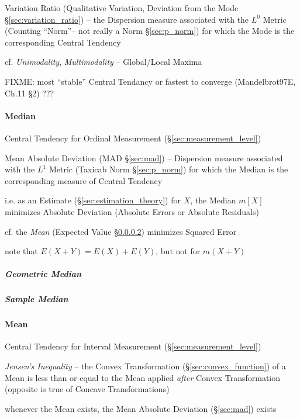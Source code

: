 \fist Variation Ratio (Qualitative Variation, Deviation from the Mode
\S\ref{sec:variation_ratio}) -- the Dispersion measure associated with the $L^0$
Metric (Counting ``Norm''-- not really a Norm \S\ref{sec:p_norm}) for which the
Mode is the corresponding Central Tendency

cf. \emph{Unimodality}, \emph{Multimodality} -- Global/Local Maxima

FIXME: most ``stable'' Central Tendancy or fastest to converge (Mandelbrot97E,
Ch.11 \S 2) ???



\paragraph{Median}\label{sec:median}\hfill

Central Tendency for Ordinal Measurement (\S\ref{sec:measurement_level})

\fist Mean Absolute Deviation (MAD \S\ref{sec:mad}) -- Dispersion measure
associated with the $L^1$ Metric (Taxicab Norm \S\ref{sec:p_norm}) for which the
Median is the corresponding measure of Central Tendency

i.e. as an Estimate (\S\ref{sec:estimation_theory}) for $X$, the Median $m[X]$
minimizes Absolute Deviation (Absolute Errors or Absolute Residuals)

cf. the \emph{Mean} (Expected Value \S\ref{sec:mean}) minimizes Squared Error

note that $E(X + Y) = E(X) + E(Y)$, but not for $m(X+Y)$



\subparagraph{Geometric Median}\label{sec:geometric_median}\hfill

\subparagraph{Sample Median}\label{sec:sample_median}\hfill



\paragraph{Mean}\label{sec:mean}\hfill

Central Tendency for Interval Measurement (\S\ref{sec:measurement_level})

\emph{Jensen's Inequality} -- the Convex Transformation
(\S\ref{sec:convex_function}) of a Mean is less than or equal to the Mean
applied \emph{after} Convex Transformation (opposite is true of Concave
Transformations)

whenever the Mean exists, the Mean Absolute Deviation (\S\ref{sec:mad}) exists



